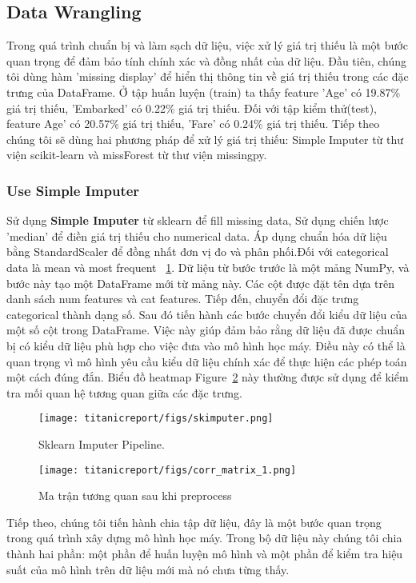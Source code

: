 \documentclass[11pt]{article}
\begin{document}
\subsection{Data Wrangling}
Trong quá trình chuẩn bị và làm sạch dữ liệu, việc xử lý giá trị thiếu là một bước quan trọng để đảm bảo tính chính xác và đồng nhất của dữ liệu. Đầu tiên, chúng tôi dùng hàm 'missing display' để hiển thị thông tin về giá trị thiếu trong các đặc trưng của DataFrame. Ở tập huấn luyện (train) ta thấy feature 'Age' có 19.87\% giá trị thiếu, 'Embarked' có 0.22\% giá trị thiếu. Đối với tập kiểm thử(test), feature Age' có 20.57\% giá trị thiếu, 'Fare' có 0.24\% giá trị thiếu. Tiếp theo chúng tôi sẽ dùng hai phương pháp để xử lý giá trị thiếu: Simple Imputer từ thư viện scikit-learn và missForest từ thư viện missingpy.

\subsubsection{Use Simple Imputer}
Sử dụng \textbf{Simple Imputer} từ sklearn để fill missing data, Sử dụng chiến lược 'median' để điền giá trị thiếu cho numerical data. Áp dụng chuẩn hóa dữ liệu bằng StandardScaler để đồng nhất đơn vị đo và phân phối.Đối với categorical data là mean và most frequent ~\ref{fig:skimputer}. Dữ liệu từ bước trước là một mảng NumPy, và bước này tạo một DataFrame mới từ mảng này. Các cột được đặt tên dựa trên danh sách num features và cat features. Tiếp đến, chuyển đổi đặc trưng categorical thành dạng số. Sau đó tiến hành các bước chuyển đổi kiểu dữ liệu của một số cột trong DataFrame. Việc này giúp đảm bảo rằng dữ liệu đã được chuẩn bị có kiểu dữ liệu phù hợp cho việc đưa vào mô hình học máy. Điều này có thể là quan trọng vì mô hình yêu cầu kiểu dữ liệu chính xác để thực hiện các phép toán một cách đúng đắn. Biểu đồ heatmap Figure~\ref{fig:heatmap} này thường được sử dụng để kiểm tra mối quan hệ tương quan giữa các đặc trưng.\\
\begin{figure}[ht]
    \centering
    \texttt{[image: titanicreport/figs/skimputer.png]}
    \caption{Sklearn Imputer Pipeline.}
    \label{fig:skimputer}
\end{figure}
\begin{figure}[ht]
    \centering
    \texttt{[image: titanicreport/figs/corr\_matrix\_1.png]}
    \caption{Ma trận tương quan sau khi preprocess}
    \label{fig:heatmap}
\end{figure}
Tiếp theo, chúng tôi tiến hành chia tập dữ liệu, đây là một bước quan trọng trong quá trình xây dựng mô hình học máy. Trong bộ dữ liệu này chúng tôi chia thành hai phần: một phần để huấn luyện mô hình và một phần để kiểm tra hiệu suất của mô hình trên dữ liệu mới mà nó chưa từng thấy.\\
\end{document}
